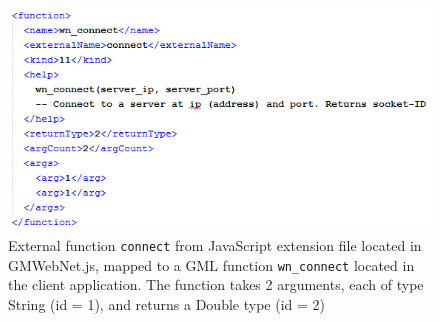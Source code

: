 \documentclass[bsc,frontabs,twoside,singlespacing,parskip,deptreport]{infthesis}     %
\begin{document}
\begin{figure}[H]
\centering
\includegraphics[scale=1.2]{images/xml_mapping.png}
\caption{External function \texttt{connect} from JavaScript extension file located in GMWebNet.js, mapped to a GML function \texttt{wn\_connect} located in the client application. The function takes 2 arguments, each of type String (id = 1), and returns a Double type (id = 2)}
\label{fig:xml_mapping}
\vspace{1em}
\end{figure}
\end{document}
